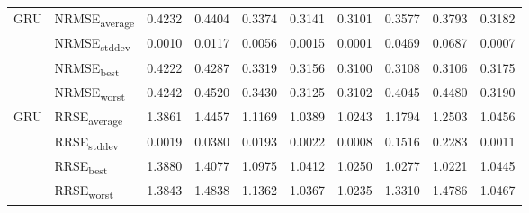 {\begin{longtable}{l l c c c c c c c c}
\cmidrule(lr){2-10}
\multirow{4}{*}{GRU} & NRMSE\textsubscript{average} & 0.4232 & 0.4404 & 0.3374 & 0.3141 & 0.3101 & 0.3577 & 0.3793 & 0.3182 \\
 & NRMSE\textsubscript{stddev} & 0.0010 & 0.0117 & 0.0056 & 0.0015 & 0.0001 & 0.0469 & 0.0687 & 0.0007 \\
 & NRMSE\textsubscript{best} & 0.4222 & 0.4287 & 0.3319 & 0.3156 & 0.3100 & 0.3108 & 0.3106 & 0.3175 \\
 & NRMSE\textsubscript{worst} & 0.4242 & 0.4520 & 0.3430 & 0.3125 & 0.3102 & 0.4045 & 0.4480 & 0.3190 \\
\cmidrule(lr){2-10}
\multirow{4}{*}{GRU} & RRSE\textsubscript{average} & 1.3861 & 1.4457 & 1.1169 & 1.0389 & 1.0243 & 1.1794 & 1.2503 & 1.0456 \\
 & RRSE\textsubscript{stddev} & 0.0019 & 0.0380 & 0.0193 & 0.0022 & 0.0008 & 0.1516 & 0.2283 & 0.0011 \\
 & RRSE\textsubscript{best} & 1.3880 & 1.4077 & 1.0975 & 1.0412 & 1.0250 & 1.0277 & 1.0221 & 1.0445 \\
 & RRSE\textsubscript{worst} & 1.3843 & 1.4838 & 1.1362 & 1.0367 & 1.0235 & 1.3310 & 1.4786 & 1.0467 \\
\cmidrule(lr){2-10}
\end{longtable}
}